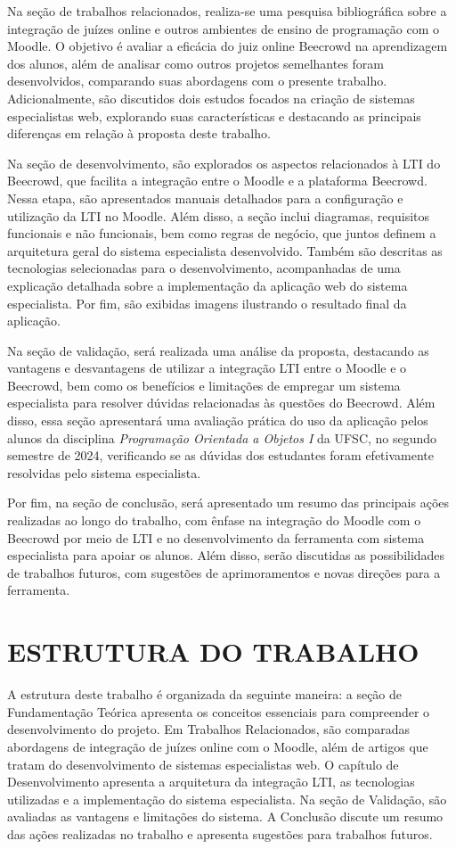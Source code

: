 Na seção de trabalhos relacionados, realiza-se uma pesquisa bibliográfica sobre a integração de juízes online e outros ambientes de ensino de programação com o Moodle. O objetivo é avaliar a eficácia do juiz online Beecrowd na aprendizagem dos alunos, além de analisar como outros projetos semelhantes foram desenvolvidos, comparando suas abordagens com o presente trabalho. Adicionalmente, são discutidos dois estudos focados na criação de sistemas especialistas web, explorando suas características e destacando as principais diferenças em relação à proposta deste trabalho.

Na seção de desenvolvimento, são explorados os aspectos relacionados à LTI do Beecrowd, que facilita a integração entre o Moodle e a plataforma Beecrowd. Nessa etapa, são apresentados manuais detalhados para a configuração e utilização da LTI no Moodle. Além disso, a seção inclui diagramas, requisitos funcionais e não funcionais, bem como regras de negócio, que juntos definem a arquitetura geral do sistema especialista desenvolvido. Também são descritas as tecnologias selecionadas para o desenvolvimento, acompanhadas de uma explicação detalhada sobre a implementação da aplicação web do sistema especialista. Por fim, são exibidas imagens ilustrando o resultado final da aplicação.

Na seção de validação, será realizada uma análise da proposta, destacando as vantagens e desvantagens de utilizar a integração LTI entre o Moodle e o Beecrowd, bem como os benefícios e limitações de empregar um sistema especialista para resolver dúvidas relacionadas às questões do Beecrowd. Além disso, essa seção apresentará uma avaliação prática do uso da aplicação pelos alunos da disciplina \textit{Programação Orientada a Objetos I} da UFSC, no segundo semestre de 2024, verificando se as dúvidas dos estudantes foram efetivamente resolvidas pelo sistema especialista.

Por fim, na seção de conclusão, será apresentado um resumo das principais ações realizadas ao longo do trabalho, com ênfase na integração do Moodle com o Beecrowd por meio de LTI e no desenvolvimento da ferramenta com sistema especialista para apoiar os alunos. Além disso, serão discutidas as possibilidades de trabalhos futuros, com sugestões de aprimoramentos e novas direções para a ferramenta.

\section{ESTRUTURA DO TRABALHO}

A estrutura deste trabalho é organizada da seguinte maneira: a seção de Fundamentação Teórica apresenta os conceitos essenciais para compreender o desenvolvimento do projeto. Em Trabalhos Relacionados, são comparadas abordagens de integração de juízes online com o Moodle, além de artigos que tratam do desenvolvimento de sistemas especialistas web. O capítulo de Desenvolvimento apresenta a arquitetura da integração LTI, as tecnologias utilizadas e a implementação do sistema especialista. Na seção de Validação, são avaliadas as vantagens e limitações do sistema. A Conclusão discute um resumo das ações realizadas no trabalho e apresenta sugestões para trabalhos futuros.
